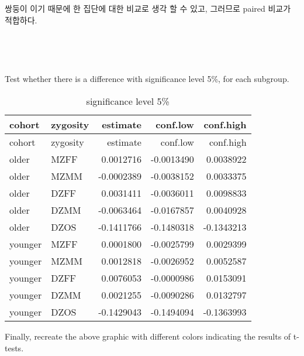 \documentclass[]{article}
\newenvironment{Shaded}{\begin{snugshade}}{\end{snugshade}}
\newcommand{\KeywordTok}[1]{\textcolor[rgb]{0.13,0.29,0.53}{\textbf{#1}}}
\newcommand{\DataTypeTok}[1]{\textcolor[rgb]{0.13,0.29,0.53}{#1}}
\newcommand{\DecValTok}[1]{\textcolor[rgb]{0.00,0.00,0.81}{#1}}
\newcommand{\FloatTok}[1]{\textcolor[rgb]{0.00,0.00,0.81}{#1}}
\newcommand{\StringTok}[1]{\textcolor[rgb]{0.31,0.60,0.02}{#1}}
\newcommand{\OtherTok}[1]{\textcolor[rgb]{0.56,0.35,0.01}{#1}}
\newcommand{\OperatorTok}[1]{\textcolor[rgb]{0.81,0.36,0.00}{\textbf{#1}}}
\newcommand{\NormalTok}[1]{#1}
\begin{document}
쌍둥이 이기 때문에 한 집단에 대한 비교로 생각 할 수 있고, 그러므로
paired 비교가 적합하다.

~

~

Test whether there is a difference with significance level 5\%, for each
subgroup.

\begin{Shaded}
\end{Shaded}

\begin{longtable}[]{@{}llrrr@{}}
\caption{significance level 5\%}\tabularnewline
\toprule
cohort & zygosity & estimate & conf.low & conf.high\tabularnewline
\midrule
\endfirsthead
\toprule
cohort & zygosity & estimate & conf.low & conf.high\tabularnewline
\midrule
\endhead
older & MZFF & 0.0012716 & -0.0013490 & 0.0038922\tabularnewline
older & MZMM & -0.0002389 & -0.0038152 & 0.0033375\tabularnewline
older & DZFF & 0.0031411 & -0.0036011 & 0.0098833\tabularnewline
older & DZMM & -0.0063464 & -0.0167857 & 0.0040928\tabularnewline
older & DZOS & -0.1411766 & -0.1480318 & -0.1343213\tabularnewline
younger & MZFF & 0.0001800 & -0.0025799 & 0.0029399\tabularnewline
younger & MZMM & 0.0012818 & -0.0026952 & 0.0052587\tabularnewline
younger & DZFF & 0.0076053 & -0.0000986 & 0.0153091\tabularnewline
younger & DZMM & 0.0021255 & -0.0090286 & 0.0132797\tabularnewline
younger & DZOS & -0.1429043 & -0.1494094 & -0.1363993\tabularnewline
\bottomrule
\end{longtable}

Finally, recreate the above graphic with different colors indicating the
results of t-tests.
\end{document}
